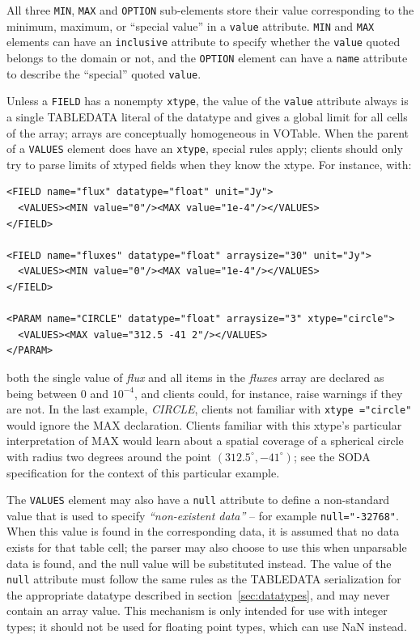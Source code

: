 \documentclass[11pt,a4paper]{ivoa}
\def\Aref#1{section~\ref{#1}}
\let\fg=\color
\def\attr#1{{\tt{\fg{DarkRed}#1}}}
\def\elem#1{{\tt{\fg{DarkRed}#1}}}
\def\attrval#1#2{{\tt{\fg{DarkRed}#1}="{\fg{DarkPurple}#2}"}}
\begin{document}
All three \elem{MIN}, \elem{MAX} and \elem{OPTION} sub-elements
store their value corresponding to the minimum, maximum, or ``special value''
in a \attr{value} attribute. \elem{MIN} and \elem{MAX} elements
can have an \attr{inclusive} attribute to specify whether the \attr{value}
quoted belongs to the domain or not, and the  \elem{OPTION} element
can have a \attr{name} attribute to describe the ``special'' quoted
\attr{value}.

Unless a \elem{FIELD} has a nonempty \attr{xtype}, the value of the
\attr{value} attribute always is a single TABLEDATA literal of
the datatype and gives a global limit for all cells of the array; arrays
are conceptually homogeneous in VOTable.  When the parent of a
\elem{VALUES} element does have an \attr{xtype}, special rules apply;
clients should only try to parse limits of xtyped fields when they know
the xtype.  For instance, with:

\begin{verbatim}
<FIELD name="flux" datatype="float" unit="Jy">
  <VALUES><MIN value="0"/><MAX value="1e-4"/></VALUES>
</FIELD>

<FIELD name="fluxes" datatype="float" arraysize="30" unit="Jy">
  <VALUES><MIN value="0"/><MAX value="1e-4"/></VALUES>
</FIELD>

<PARAM name="CIRCLE" datatype="float" arraysize="3" xtype="circle">
  <VALUES><MAX value="312.5 -41 2"/></VALUES>
</PARAM>
\end{verbatim}

both the single value of \emph{flux} and all items in the \emph{fluxes}
array are declared as being between 0 and $10^{-4}$, and clients could,
for instance, raise warnings if they are not.  In the last example,
\emph{CIRCLE}, clients not familiar with \attrval{xtype }{circle} would
ignore the MAX declaration.  Clients familiar with this xtype's
particular interpretation of MAX would learn about a spatial coverage of
a spherical circle with radius two degrees around the point
$(312.5^\circ,-41^\circ)$; see the SODA specification
\citep{2017ivoa.spec.0517B} for the context of this particular example.

The \elem{VALUES} element may also have a \attr{null} attribute
to define a non-standard value that is used to specify
{\em``non-existent data''} -- for example \attrval{null}{-32768}.
When this value is found in the corresponding data, it is assumed that no data
exists for that table cell; the parser may also choose to use this
when unparsable data is found, and the null value will be substituted
instead.
The value of the \attr{null} attribute must follow the same rules
as the TABLEDATA serialization for the appropriate datatype
described in \Aref{sec:datatypes},
and may never contain an array value.
This mechanism is only intended for use with integer types;
it should not be used for floating point types, which can use NaN instead.
\end{document}
